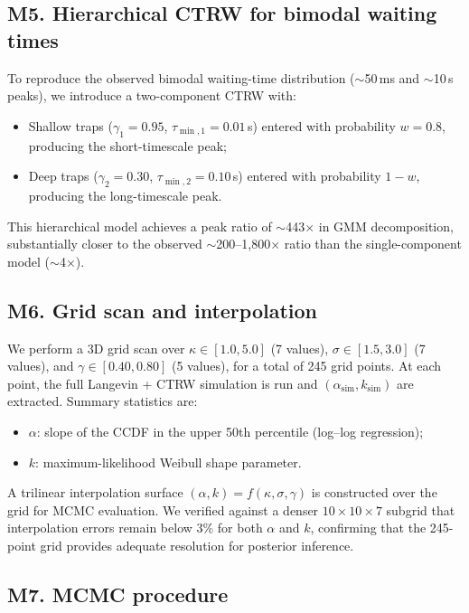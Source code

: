 \subsection*{M5. Hierarchical CTRW for bimodal waiting times}

To reproduce the observed bimodal waiting-time distribution ($\sim$50\,ms and $\sim$10\,s peaks), we introduce a two-component CTRW with:
\begin{itemize}
\item Shallow traps ($\gamma_1 = 0.95$, $\tau_{\min,1} = 0.01$\,s) entered with probability $w = 0.8$, producing the short-timescale peak;
\item Deep traps ($\gamma_2 = 0.30$, $\tau_{\min,2} = 0.10$\,s) entered with probability $1-w$, producing the long-timescale peak.
\end{itemize}
This hierarchical model achieves a peak ratio of $\sim$443$\times$ in GMM decomposition, substantially closer to the observed $\sim$200--1{,}800$\times$ ratio than the single-component model ($\sim$4$\times$).

\subsection*{M6. Grid scan and interpolation}

We perform a 3D grid scan over $\kappa \in [1.0, 5.0]$ (7 values), $\sigma \in [1.5, 3.0]$ (7 values), and $\gamma \in [0.40, 0.80]$ (5 values), for a total of 245 grid points. At each point, the full Langevin + CTRW simulation is run and $(\alpha_{\mathrm{sim}}, k_{\mathrm{sim}})$ are extracted. Summary statistics are:
\begin{itemize}
\item $\alpha$: slope of the CCDF in the upper 50th percentile (log--log regression);
\item $k$: maximum-likelihood Weibull shape parameter.
\end{itemize}
A trilinear interpolation surface $(\alpha, k) = f(\kappa, \sigma, \gamma)$ is constructed over the grid for MCMC evaluation. We verified against a denser $10 \times 10 \times 7$ subgrid that interpolation errors remain below 3\% for both $\alpha$ and $k$, confirming that the 245-point grid provides adequate resolution for posterior inference.

\subsection*{M7. MCMC procedure}

